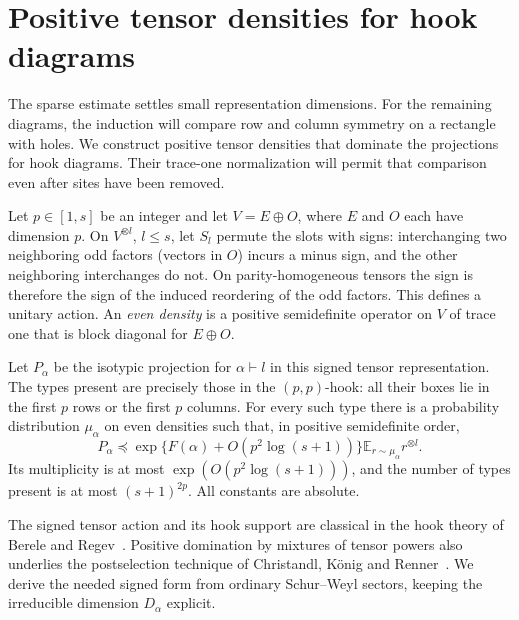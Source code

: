 \section{Positive tensor densities for hook diagrams}\label{sec:density}
\label{ac:part:120}

The sparse estimate settles small representation dimensions. For the
remaining diagrams, the induction will compare row and column symmetry on
a rectangle with holes. We construct positive tensor densities that
dominate the projections for hook diagrams. Their trace-one normalization
will permit that comparison even after sites have been removed.

Let \(p\in[1,s]\) be an integer and let \(V=E\oplus O\), where \(E\) and
\(O\) each have dimension \(p\). On \(V^{\otimes l}\), \(l\le s\), let
\(S_l\) permute the slots with signs: interchanging two neighboring odd
factors (vectors in \(O\)) incurs a minus sign, and the other neighboring
interchanges do not. On parity-homogeneous tensors the sign is therefore
the sign of the induced reordering of the odd factors. This defines a
unitary action. An \emph{even density} is a positive semidefinite operator
on \(V\) of trace one that is block diagonal for \(E\oplus O\).

\begin{lemma}\label{lem:density}
Let \(P_\alpha\) be the isotypic projection for \(\alpha\vdash l\) in this
signed tensor representation. The types present are precisely those in the
\((p,p)\)-hook: all their boxes lie in the first \(p\) rows or the first
\(p\) columns. For every such type there is a probability distribution
\(\mu_\alpha\) on even densities such that, in positive semidefinite order,
\begin{equation}
 P_\alpha\preceq
 \exp\{F(\alpha)+O(p^2\log(s+1))\}
 \mathbb E_{r\sim\mu_\alpha}r^{\otimes l}.
 \label{ac:eq:13}
\end{equation}
Its multiplicity is at most \(\exp(O(p^2\log(s+1)))\), and the number of
types present is at most \((s+1)^{2p}\). All constants are absolute.
\end{lemma}

The signed tensor action and its hook support are classical in the hook
theory of Berele and Regev~\cite{BereleRegev1983}. Positive domination by
mixtures of tensor powers also underlies the postselection technique of
Christandl, K\"onig and Renner~\cite{ChristandlKonigRenner2009}. We derive
the needed signed form from ordinary Schur--Weyl sectors, keeping the
irreducible dimension \(D_\alpha\) explicit.


